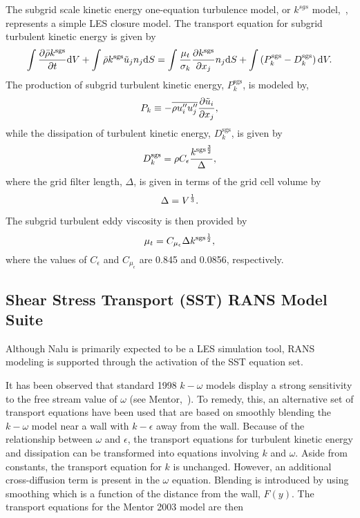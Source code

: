 The subgrid scale kinetic energy one-equation turbulence model, or 
$k^{sgs}$ model,~\cite{Davidson:1997}, represents a simple LES closure model.  The transport 
equation for subgrid turbulent kinetic energy is given by
%
\begin{equation}
  \int {{\partial \bar{\rho}{k^\mathrm{sgs}}} \over {\partial t}} {\rm d}V
  + \int \bar{\rho}{k^\mathrm{sgs}} \tilde{u}_j n_j {\rm d}S = 
    \int {{\mu_t} \over {\sigma_k}} 
          {{\partial {k^\mathrm{sgs}}} \over
           {\partial x_j}} n_j {\rm d}S + 
   \int \left(P_k^\mathrm{sgs} - D_k^\mathrm{sgs}\right) {\rm d}V.
\label{ksgs}
\end{equation}
%
The production of subgrid turbulent kinetic energy, $P_k^\mathrm{sgs}$, is 
modeled by,
\begin{equation}
   P_k \equiv  -\overline{\rho u_i'' u_j''}
      {{\partial \tilde{u}_i} \over {\partial x_j}},
\label{mod-prod}     
\end{equation}
while the dissipation of turbulent kinetic energy, $D_k^\mathrm{sgs}$, is given by
%
\begin{equation}
D_k^\mathrm{sgs} = \rho C_{\epsilon} { { {k^\mathrm{sgs}}^{{3}\over {2}} } 
     \over { \Delta} },
\end{equation}
%
where the grid filter length, $\Delta$, is given in terms of the grid cell
volume by
%
\begin{equation}
\Delta = V^{{1}\over{3}}.
\end{equation}

The subgrid turbulent eddy viscosity is then provided by 
%
\begin{equation}
\mu_t = C_{\mu_{\epsilon}} \Delta {k^\mathrm{sgs}}^{{1} \over {2}},
\end{equation}
%
where the values of $C_{\epsilon}$ and $C_{\mu_{\epsilon}}$ are 
0.845 and 0.0856, respectively.

\subsection{Shear Stress Transport (SST) RANS Model Suite} \label{sec:sst}
Although Nalu is primarily expected to be a LES simulation tool, RANS modeling is supported
through the activation of the SST equation set.

It has been observed that standard 1998 $k-\omega$ models display a strong sensitivity 
to the free stream value of $\omega$ (see Mentor,~\cite{Mentor:2003}).  To remedy, this, an 
alternative set of transport equations have been used that are based on smoothly 
blending the $k-\omega$ model near a wall with $k-\epsilon$ away from the wall.  
Because of the relationship between $\omega$ and $\epsilon$, the transport equations 
for turbulent kinetic energy and dissipation can be transformed into equations 
involving $k$ and $\omega$.  Aside from constants, the transport equation for 
$k$ is unchanged.  However, an additional cross-diffusion term is present in 
the $\omega$ equation.  Blending is introduced by using smoothing which is a 
function of the distance from the wall, $F(y)$.  The transport equations for the Mentor 2003 model
 are then

